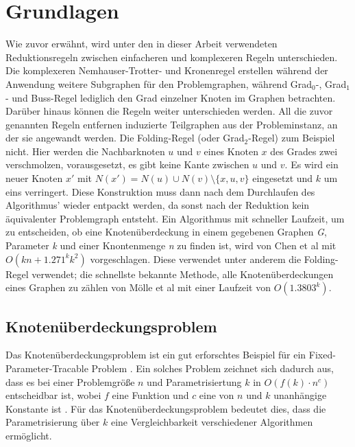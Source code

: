 
\chapter{Grundlagen}
\label{ch:Grundlagen}
Wie zuvor erwähnt, wird unter den in dieser Arbeit verwendeten Reduktionsregeln zwischen einfacheren und komplexeren Regeln unterschieden. Die komplexeren Nemhauser-Trotter- und Kronenregel erstellen während der Anwendung weitere Subgraphen für den Problemgraphen, während Grad$_{0}$-, Grad$_{1}$- und Buss-Regel lediglich den Grad einzelner Knoten im Graphen betrachten. Darüber hinaus können die Regeln weiter unterschieden werden. All die zuvor genannten Regeln entfernen induzierte Teilgraphen aus der Probleminstanz, an der sie angewandt werden. Die Folding-Regel \cite{paper:4} (oder Grad$_{2}$-Regel) zum Beispiel nicht. Hier werden die Nachbarknoten $u$ und $v$ eines Knoten $x$ des Grades zwei verschmolzen, vorausgesetzt, es gibt keine Kante zwischen  $u$ und $v$. Es wird ein neuer Knoten $x'$ mit $N(x') = N(u) \cup N(v) \setminus \{x,u,v\}$ eingesetzt und $k$ um eins verringert. Diese Konstruktion muss dann nach dem Durchlaufen des Algorithmus' wieder entpackt werden, da sonst nach der Reduktion kein äquivalenter Problemgraph entsteht. 
Ein Algorithmus mit schneller Laufzeit, um zu entscheiden, ob eine Knotenüberdeckung in einem gegebenen Graphen \emph{G}, Parameter \emph{k} und einer Knontenmenge \emph{n} zu finden ist, wird von Chen et al \cite{paper:4} mit $O(kn + 1.271^{k}k^{2})$ vorgeschlagen. Diese verwendet unter anderem die Folding-Regel verwendet; die schnellste bekannte Methode, alle Knotenüberdeckungen eines Graphen zu zählen von Mölle et al \cite{paper:5} mit einer Laufzeit von $O(1.3803^{k})$.

\section{Knotenüberdeckungsproblem}
Das Knotenüberdeckungsproblem ist ein gut erforschtes Beispiel für ein Fixed-Parameter-Tracable Problem \cite{complex}. Ein solches Problem zeichnet sich dadurch aus, dass es bei einer Problemgröße $n$ und Parametrisiertung $k$ in $O(f(k) \cdot n^{c})$ entscheidbar ist, wobei $f$ eine Funktion und $c$ eine von $n$ und $k$ unanhängige Konstante ist \cite{paper:2}. Für das Knotenüberdeckungsproblem bedeutet dies, dass die Parametrisierung über $k$ eine Vergleichbarkeit verschiedener Algorithmen ermöglicht.

